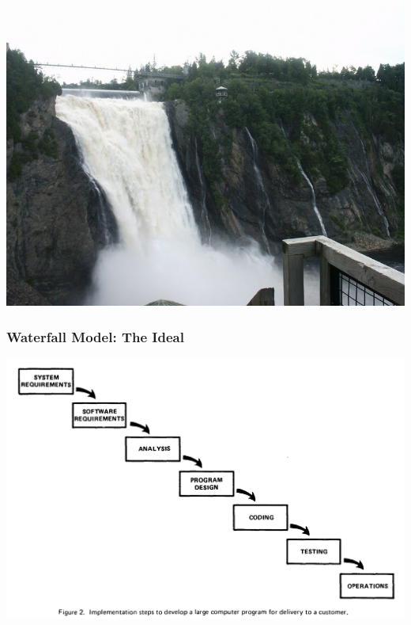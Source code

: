 \begin{frame}
\begin{center}
\includegraphics[height=.9\textheight]{images/0116_falls_and_rock}
\end{center}
\end{frame}

\begin{frame}[fragile]
\frametitle{Waterfall Model: The Ideal}

\begin{center}
\includegraphics[height=.7\textheight]{images/classic-waterfall.png}
\end{center}

\end{frame}

